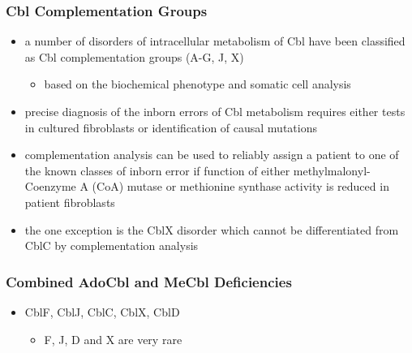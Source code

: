 \documentclass[12pt]{scrartcl}
\begin{document}
\subsubsection{Cbl Complementation Groups}
\label{sec:orgf05c8a7}
\begin{itemize}
\item a number of disorders of intracellular metabolism of Cbl have been
classified as Cbl complementation groups (A-G, J, X)
\begin{itemize}
\item based on the biochemical phenotype and somatic cell analysis
\end{itemize}
\item precise diagnosis of the inborn errors of Cbl metabolism requires
either tests in cultured fibroblasts or identification of causal
mutations
\item complementation analysis can be used to reliably assign a patient to
one of the known classes of inborn error if function of either
methylmalonyl-Coenzyme A (CoA) mutase or methionine synthase
activity is reduced in patient fibroblasts
\item the one exception is the CblX disorder which cannot be
differentiated from CblC by complementation analysis
\end{itemize}
\subsubsection{Combined AdoCbl and MeCbl Deficiencies}
\label{sec:orgf42ee5f}
\begin{itemize}
\item CblF, CblJ, CblC, CblX, CblD
\begin{itemize}
\item F, J, D and X are very rare
\end{itemize}
\end{itemize}
\end{document}
